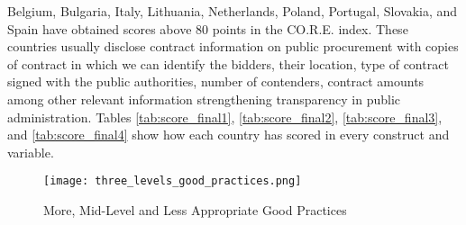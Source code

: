 \documentclass[a4paper, twoside]{report}
\begin{document}
Belgium, Bulgaria, Italy, Lithuania, Netherlands, Poland, Portugal, Slovakia, and Spain have obtained scores above 80 points in the CO.R.E. index. These countries usually disclose contract information on public procurement with copies of contract in which we can identify the bidders, their location, type of contract signed with the public authorities, number of contenders, contract amounts among other relevant information strengthening transparency in public administration. Tables \ref{tab:score_final1}, \ref{tab:score_final2}, \ref{tab:score_final3}, and \ref{tab:score_final4} show how each country has scored in every construct and variable.


\begin{figure}[H]
\centering
	\caption{More, Mid-Level and Less Appropriate Good Practices}
	\texttt{[image: three\_levels\_good\_practices.png]}
	\label{fig:three_levels_good_practices}
\end{figure}
\end{document}
